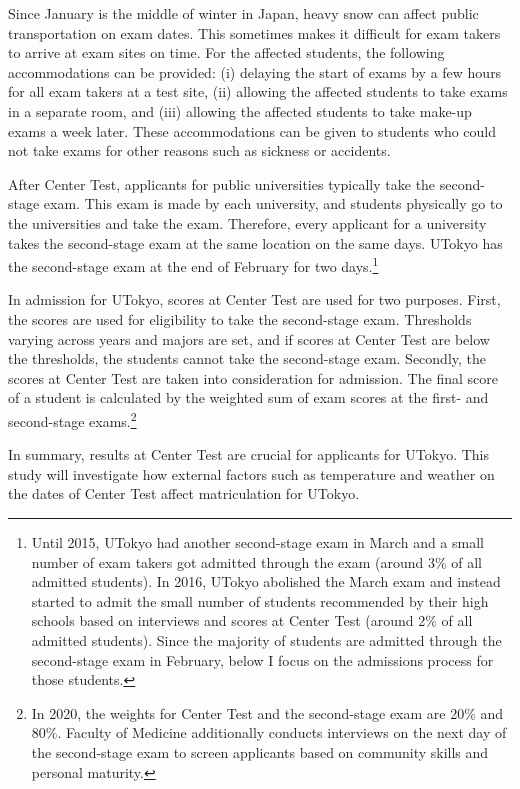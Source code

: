 \documentclass[12pt,letterpaper]{article}
\begin{document}
Since January is the middle of winter in Japan, heavy snow can affect public transportation on exam dates.
This sometimes makes it difficult for exam takers to arrive at exam sites on time.
For the affected students, the following accommodations can be provided:
(i) delaying the start of exams by a few hours for all exam takers at a test site,
(ii) allowing the affected students to take exams in a separate room, and
(iii) allowing the affected students to take make-up exams a week later.
These accommodations can be given to students who could not take exams for other reasons such as sickness or accidents.

After Center Test, applicants for public universities typically take the second-stage exam.
This exam is made by each university, and students physically go to the universities and take the exam.
Therefore, every applicant for a university takes the second-stage exam at the same location on the same days.
UTokyo has the second-stage exam at the end of February for two days.\footnote{
  Until 2015, UTokyo had another second-stage exam in March and a small number of exam takers got admitted through the exam (around 3\% of all admitted students).
  In 2016, UTokyo abolished the March exam and instead started to admit the small number of students recommended by their high schools based on interviews and scores at Center Test (around 2\% of all admitted students).
  Since the majority of students are admitted through the second-stage exam in February, below I focus on the admissions process for those students. 
}

In admission for UTokyo, scores at Center Test are used for two purposes.
First, the scores are used for eligibility to take the second-stage exam.
Thresholds varying across years and majors are set, and if scores at Center Test are below the thresholds, the students cannot take the second-stage exam.
Secondly, the scores at Center Test are taken into consideration for admission.
The final score of a student is calculated by the weighted sum of exam scores at the first- and second-stage exams.\footnote{
  In 2020, the weights for Center Test and the second-stage exam are 20\% and 80\%.
  Faculty of Medicine additionally conducts interviews on the next day of the second-stage exam to screen applicants based on community skills and personal maturity.
}

In summary, results at Center Test are crucial for applicants for UTokyo.
This study will investigate how external factors such as temperature and weather on the dates of Center Test affect matriculation for UTokyo.
\end{document}
